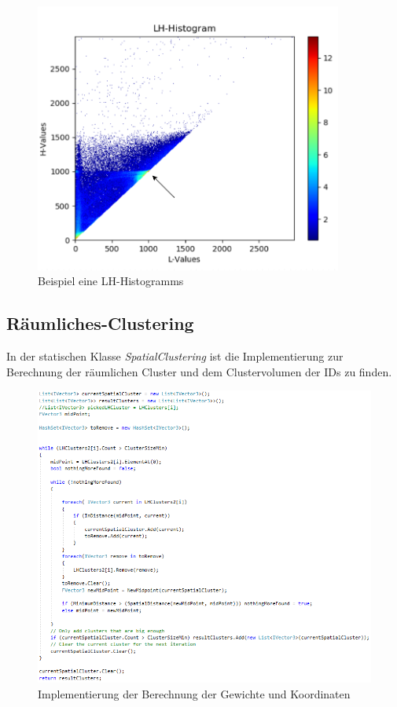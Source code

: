 \begin{figure}[H] 
\includegraphics[width=0.9\textwidth]{Logos/LHHistogram_a.png}
\caption{Beispiel eine LH-Histogramms} 
\label{fig:lh_histo} 
\end{figure}


\subsection{Räumliches-Clustering}

In der statischen Klasse \textit{SpatialClustering} ist die Implementierung zur Berechnung der räumlichen Cluster und dem Clustervolumen der IDs zu finden.


\begin{figure}[!h] 
\includegraphics[width=1.2\textwidth]{Logos/Spatial_Code.PNG}
\caption{Implementierung der Berechnung der Gewichte und Koordinaten} 
\label{fig:spatclust_code} 
\end{figure}


